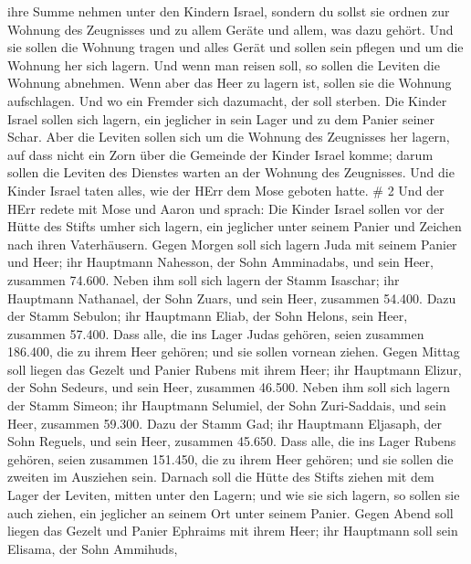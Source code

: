 ihre Summe nehmen unter den Kindern Israel,  sondern du
sollst sie ordnen zur Wohnung des Zeugnisses und zu allem Geräte und
allem, was dazu gehört. Und sie sollen die Wohnung tragen und alles
Gerät und sollen sein pflegen und um die Wohnung her sich lagern.
 Und wenn man reisen soll, so sollen die Leviten die
Wohnung abnehmen. Wenn aber das Heer zu lagern ist, sollen sie die
Wohnung aufschlagen. Und wo ein Fremder sich dazumacht, der soll
sterben.  Die Kinder Israel sollen sich lagern, ein
jeglicher in sein Lager und zu dem Panier seiner Schar. 
Aber die Leviten sollen sich um die Wohnung des Zeugnisses her lagern,
auf dass nicht ein Zorn über die Gemeinde der Kinder Israel komme; darum
sollen die Leviten des Dienstes warten an der Wohnung des Zeugnisses.
 Und die Kinder Israel taten alles, wie der HErr dem Mose
geboten hatte. \# 2  Und der HErr redete mit Mose und Aaron
und sprach:  Die Kinder Israel sollen vor der Hütte des
Stifts umher sich lagern, ein jeglicher unter seinem Panier und Zeichen
nach ihren Vaterhäusern.  Gegen Morgen soll sich lagern Juda
mit seinem Panier und Heer; ihr Hauptmann Nahesson, der Sohn Amminadabs,
 und sein Heer, zusammen 74.600.  Neben ihm soll
sich lagern der Stamm Isaschar; ihr Hauptmann Nathanael, der Sohn Zuars,
 und sein Heer, zusammen 54.400.  Dazu der Stamm
Sebulon; ihr Hauptmann Eliab, der Sohn Helons,  sein Heer,
zusammen 57.400.  Dass alle, die ins Lager Judas gehören,
seien zusammen 186.400, die zu ihrem Heer gehören; und sie sollen
vornean ziehen.  Gegen Mittag soll liegen das Gezelt und
Panier Rubens mit ihrem Heer; ihr Hauptmann Elizur, der Sohn Sedeurs,
 und sein Heer, zusammen 46.500.  Neben ihm
soll sich lagern der Stamm Simeon; ihr Hauptmann Selumiel, der Sohn
Zuri-Saddais,  und sein Heer, zusammen 59.300.
 Dazu der Stamm Gad; ihr Hauptmann Eljasaph, der Sohn
Reguels,  und sein Heer, zusammen 45.650. 
Dass alle, die ins Lager Rubens gehören, seien zusammen 151.450, die zu
ihrem Heer gehören; und sie sollen die zweiten im Ausziehen sein.
 Darnach soll die Hütte des Stifts ziehen mit dem Lager der
Leviten, mitten unter den Lagern; und wie sie sich lagern, so sollen sie
auch ziehen, ein jeglicher an seinem Ort unter seinem Panier.
 Gegen Abend soll liegen das Gezelt und Panier Ephraims mit
ihrem Heer; ihr Hauptmann soll sein Elisama, der Sohn Ammihuds,
